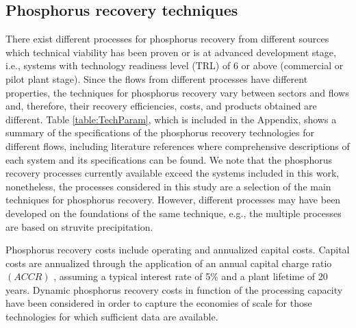 \documentclass[]{elsarticle}
\begin{document}
\subsection{Phosphorus recovery techniques} \label{section:PRecoveryTechs}
There exist different processes for phosphorus recovery from different sources which technical viability has been proven or is at advanced development stage, i.e., systems with technology readiness level (TRL) \citep{TRLDefinitions} of 6 or above (commercial or pilot plant stage). Since the flows from different processes have different properties, the techniques for phosphorus recovery vary between sectors and flows and, therefore, their recovery efficiencies, costs, and products obtained are different. Table \ref{table:TechParam}, which is included in the Appendix, shows a summary of the specifications of the phosphorus recovery technologies for different flows, including literature references where comprehensive descriptions of each system and its specifications can be found. We note that the phosphorus recovery processes currently available exceed the systems included in this work, nonetheless, the processes considered in this study are a selection of the main techniques for phosphorus recovery.
However, different processes may have been developed on the foundations of the same technique,
e.g., the multiple processes are based on struvite precipitation. 

Phosphorus recovery costs include operating and annualized capital costs. Capital costs are annualized through the application of an annual capital charge ratio $\left( ACCR\right)$ \citep{towler2013chemical}, assuming a typical interest rate of 5\% and a plant lifetime of 20 years. Dynamic phosphorus recovery costs in function of the processing capacity have been considered in order to capture the economies of scale for those technologies for which sufficient data are available.
\end{document}
